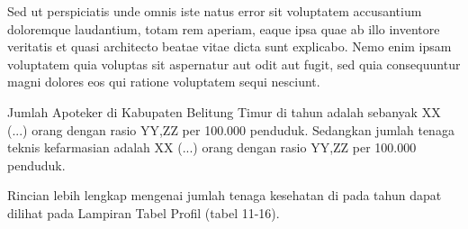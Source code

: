 Sed ut perspiciatis unde omnis iste natus error sit voluptatem accusantium doloremque laudantium, totam rem aperiam, eaque ipsa quae ab illo inventore veritatis et quasi architecto beatae vitae dicta sunt explicabo. Nemo enim ipsam voluptatem quia voluptas sit aspernatur aut odit aut fugit, sed quia consequuntur magni dolores eos qui ratione voluptatem sequi nesciunt.

Jumlah Apoteker di Kabupaten Belitung Timur di tahun \tP adalah sebanyak
XX (...) orang dengan rasio YY,ZZ per 100.000 penduduk. Sedangkan
jumlah tenaga teknis kefarmasian adalah XX (...) orang dengan rasio YY,ZZ per 100.000 penduduk.

\vspace{12pt}

Rincian lebih lengkap mengenai jumlah tenaga kesehatan di \namaKabupaten pada tahun \tP dapat dilihat pada Lampiran Tabel Profil
(tabel 11-16).
